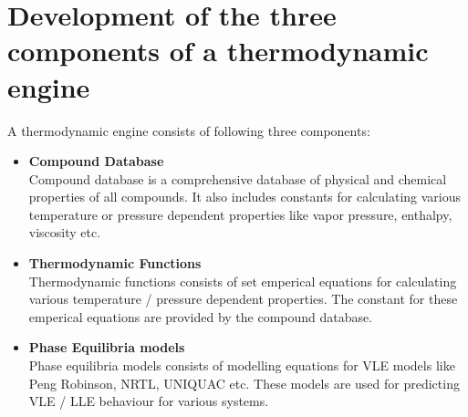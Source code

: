 \documentclass[12pt]{report}
\begin{document}
\section{Development of the three components of a thermodynamic engine}
A thermodynamic engine consists of following three components:
\begin{itemize}
\item{\textbf{Compound Database}} \\
Compound database is a comprehensive database of physical and chemical properties of all compounds. It also includes constants for calculating various temperature or pressure dependent properties like vapor pressure, enthalpy, viscosity etc. 
\item{\textbf{Thermodynamic Functions}} \\
Thermodynamic functions consists of set emperical equations for calculating various temperature / pressure dependent properties. The constant for these emperical equations are provided by the compound database. 
\item{\textbf{Phase Equilibria models}} \\
Phase equilibria models consists of modelling equations for VLE models like Peng Robinson, NRTL, UNIQUAC etc. These models are used for predicting VLE / LLE behaviour for various systems.
\end{itemize}
\end{document}

